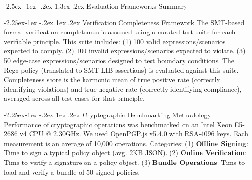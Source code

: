 \documentclass[manuscript,screen,review,anonymous,9pt]{acmart}
\makeatletter
\renewcommand\section{\@startsection{section}{1}{\z@}%
  {-2.5ex \@plus -1ex \@minus -.2ex}%
  {1.3ex \@plus.2ex}%
  {\normalfont\Large\bfseries}}
\renewcommand\subsection{\@startsection{subsection}{2}{\z@}%
  {-2.25ex\@plus -1ex \@minus -.2ex}%
  {1ex \@plus .2ex}%
  {\normalfont\large\bfseries}}
\makeatother
\begin{document}
\section{Evaluation Frameworks Summary}
\label{app:evaluation}

\subsection{Verification Completeness Framework}
The SMT-based formal verification completeness is assessed using a curated test suite for each verifiable principle. This suite includes: (1) 100 valid expressions/scenarios expected to comply. (2) 100 invalid expressions/scenarios expected to violate. (3) 50 edge-case expressions/scenarios designed to test boundary conditions. The Rego policy (translated to SMT-LIB assertions) is evaluated against this suite. Completeness score is the harmonic mean of true positive rate (correctly identifying violations) and true negative rate (correctly identifying compliance), averaged across all test cases for that principle.

\subsection{Cryptographic Benchmarking Methodology}
Performance of cryptographic operations was benchmarked on an Intel Xeon E5-2686 v4 CPU @ 2.30GHz. We used OpenPGP.js v5.4.0 with RSA-4096 keys. Each measurement is an average of 10,000 operations. Categories: (1) \textbf{Offline Signing}: Time to sign a typical policy object (avg. 2KB JSON). (2) \textbf{Online Verification}: Time to verify a signature on a policy object. (3) \textbf{Bundle Operations}: Time to load and verify a bundle of 50 signed policies.
\end{document}
